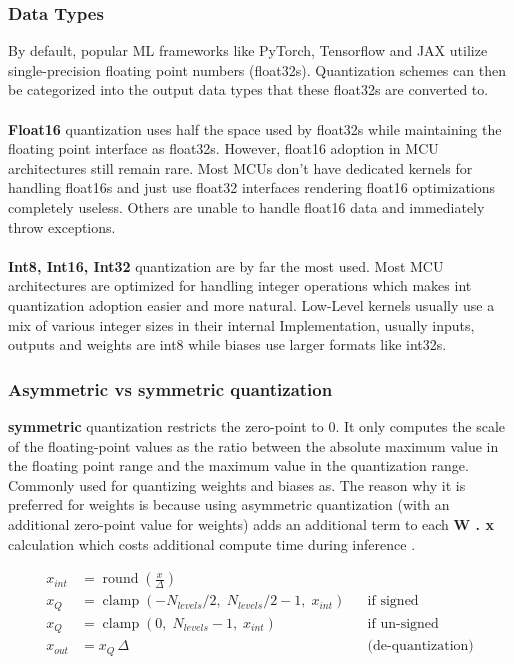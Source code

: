 \documentclass[12pt,DIV16,BCOR12mm,a4paper,footinclude=false,headinclude,parskip=half-,twoside,openright,cleardoublepage=empty,toc=index,bibliography=totoc,listof=totoc]{scrreprt}
\numberwithin{equation}{chapter}
\begin{document}
    \subsubsection{Data Types}
    By default, popular ML frameworks like PyTorch, Tensorflow and JAX utilize single-precision floating point numbers (float32s).
    Quantization schemes can then be categorized into the output data types that these float32s are converted to. 
    \\\\
    \textbf{Float16} quantization uses half the space used by float32s while maintaining the floating point interface as float32s.
    However, float16 adoption in MCU architectures still remain rare. Most MCUs don't have dedicated kernels for handling float16s and just
    use float32 interfaces rendering float16 optimizations completely useless. Others are unable to handle float16 data and immediately throw exceptions.
    \\\\
    \textbf{Int8, Int16, Int32} quantization are by far the most used. Most MCU architectures are optimized for handling integer operations which 
    makes int quantization adoption easier and more natural. Low-Level kernels usually use a mix of various integer sizes in their internal Implementation,
    usually inputs, outputs and weights are int8 while biases use larger formats like int32s. 

    \subsubsection{Asymmetric vs symmetric quantization}
    \textbf{symmetric} quantization restricts the zero-point to 0. It only computes the scale of the floating-point values 
    as the ratio between the absolute maximum value in the floating point range and the maximum value in the quantization
    range. Commonly used for quantizing weights and biases as\cite{krishnamoorthiQuantizingDeepConvolutional2018}. The
    reason why it is preferred for weights is because using asymmetric quantization (with an additional zero-point value
    for weights) adds an additional term to each \textbf{W . x} calculation which costs additional compute time during inference
    \cite{nagelWhitePaperNeural2021}.

    \begin{equation}
    \begin{aligned}
        x_{int} &= \operatorname{round}\!\left(\frac{x}{\Delta}\right) \\
        x_{Q} &= \operatorname{clamp}\!\left(-N_{levels}/2,\; N_{levels}/2 - 1,\; x_{int}\right) && \text{if signed} \\
        x_{Q} &= \operatorname{clamp}\!\left(0,\; N_{levels} - 1,\; x_{int}\right) && \text{if un-signed} \\
        x_{out} &= x_{Q}\,\Delta && \text{(de-quantization)}
    \end{aligned}
    \end{equation}
\end{document}
